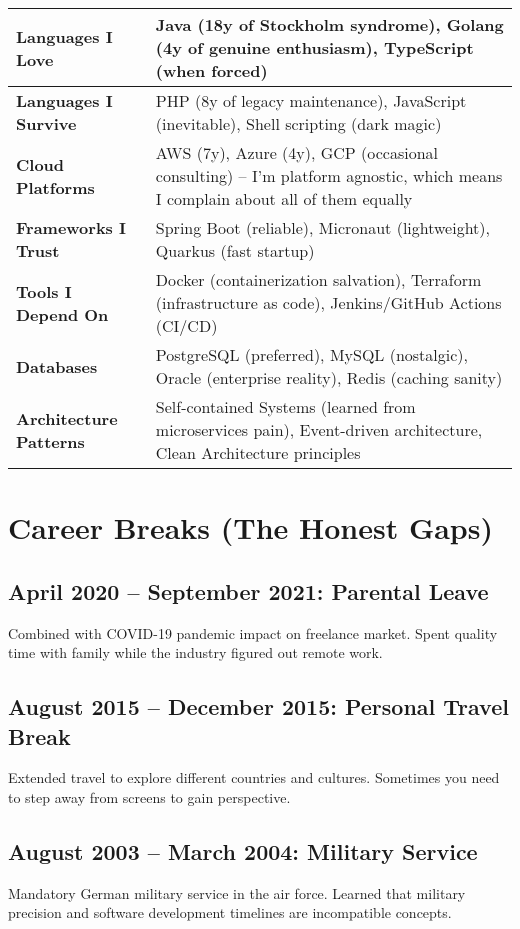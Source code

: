 \documentclass[10pt,a4paper]{article}
\begin{document}
\begin{tabularx}{\textwidth}{|l|X|}
\hline
\textbf{Languages I Love} & Java (18y of Stockholm syndrome), Golang (4y of genuine enthusiasm), TypeScript (when forced) \\
\hline
\textbf{Languages I Survive} & PHP (8y of legacy maintenance), JavaScript (inevitable), Shell scripting (dark magic) \\
\hline
\textbf{Cloud Platforms} & AWS (7y), Azure (4y), GCP (occasional consulting) -- I'm platform agnostic, which means I complain about all of them equally \\
\hline
\textbf{Frameworks I Trust} & Spring Boot (reliable), Micronaut (lightweight), Quarkus (fast startup) \\
\hline
\textbf{Tools I Depend On} & Docker (containerization salvation), Terraform (infrastructure as code), Jenkins/GitHub Actions (CI/CD) \\
\hline
\textbf{Databases} & PostgreSQL (preferred), MySQL (nostalgic), Oracle (enterprise reality), Redis (caching sanity) \\
\hline
\textbf{Architecture Patterns} & Self-contained Systems (learned from microservices pain), Event-driven architecture, Clean Architecture principles \\
\hline
\end{tabularx}

\section{Career Breaks (The Honest Gaps)}

\subsection{April 2020 -- September 2021: Parental Leave}
Combined with COVID-19 pandemic impact on freelance market. Spent quality time with family while the industry figured out remote work.

\subsection{August 2015 -- December 2015: Personal Travel Break}
Extended travel to explore different countries and cultures. Sometimes you need to step away from screens to gain perspective.

\subsection{August 2003 -- March 2004: Military Service}
Mandatory German military service in the air force. Learned that military precision and software development timelines are incompatible concepts.
\end{document}
